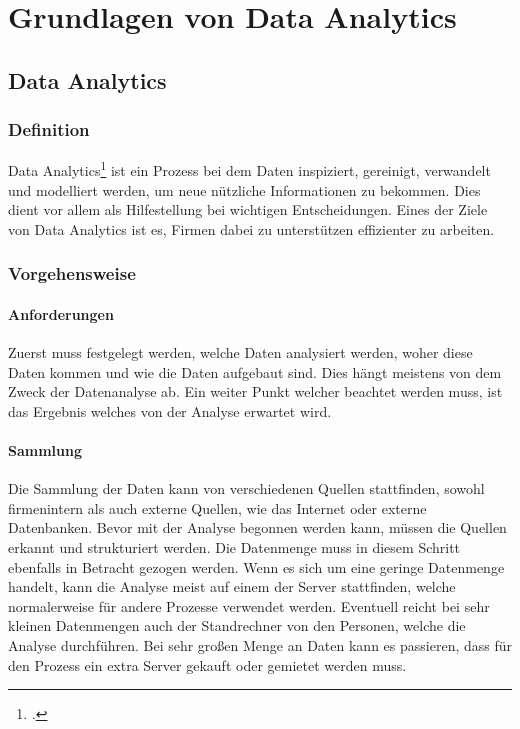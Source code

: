\chapter{Grundlagen von Data Analytics}
\bauer	
	\section{Data Analytics}	
		\subsection{Definition}
			Data Analytics\footcite{data-analysis} ist ein Prozess bei dem Daten inspiziert, gereinigt, verwandelt und modelliert werden, um neue nützliche Informationen zu bekommen. 
			Dies dient vor allem als Hilfestellung bei wichtigen Entscheidungen. Eines der Ziele von Data Analytics ist es, Firmen dabei zu unterstützen effizienter zu arbeiten. 	
		\subsection{Vorgehensweise}		
			\subsubsection{Anforderungen}
				Zuerst muss festgelegt werden, welche Daten analysiert werden, woher diese Daten kommen und wie die Daten aufgebaut sind. 
				Dies hängt meistens von dem Zweck der Datenanalyse ab. Ein weiter Punkt welcher beachtet werden muss, ist das Ergebnis welches von der Analyse erwartet wird.		
			\subsubsection{Sammlung}
				Die Sammlung der Daten kann von verschiedenen Quellen stattfinden, sowohl firmenintern als auch externe Quellen, wie das Internet oder externe Datenbanken. 
				Bevor mit der Analyse begonnen werden kann, müssen die Quellen erkannt und strukturiert werden. Die Datenmenge muss in diesem Schritt ebenfalls in Betracht gezogen werden. 
				Wenn es sich um eine geringe Datenmenge handelt, kann die Analyse meist auf einem der Server stattfinden, welche normalerweise für andere Prozesse verwendet werden. Eventuell reicht bei sehr kleinen Datenmengen auch der Standrechner von den Personen, welche die Analyse durchführen. 
				Bei sehr großen Menge an Daten kann es passieren, dass für den Prozess ein extra Server gekauft oder gemietet werden muss. 			
